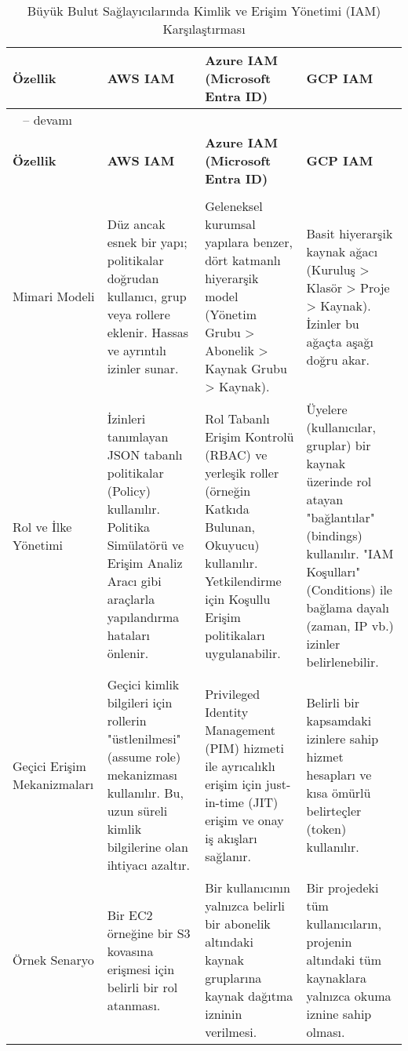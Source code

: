 \begin{longtable}{|>{\footnotesize}p{1.2cm}|>{\footnotesize}p{1.2cm}|>{\footnotesize}p{1.4cm}|>{\footnotesize}p{1.1cm}|}
\caption{Büyük Bulut Sağlayıcılarında Kimlik ve Erişim Yönetimi (IAM) Karşılaştırması}
\label{tab:iam_comparison}\\
\hline
\textbf{Özellik} & \textbf{AWS IAM} & \textbf{Azure IAM (Microsoft Entra ID)} & \textbf{GCP IAM}\\
\hline
\endfirsthead
\multicolumn{4}{c}%
{\tablename\ \thetable{} -- devamı}\\
\hline
\textbf{Özellik} & \textbf{AWS IAM} & \textbf{Azure IAM (Microsoft Entra ID)} & \textbf{GCP IAM}\\
\hline
\endhead
\hline
\multicolumn{4}{|r|}{Devamı bir sonraki sayfada}\\
\hline
\endfoot
\hline
\endlastfoot
Mimari Modeli & Düz ancak esnek bir yapı; politikalar doğrudan kullanıcı, grup veya rollere eklenir. Hassas ve ayrıntılı izinler sunar. & Geleneksel kurumsal yapılara benzer, dört katmanlı hiyerarşik model (Yönetim Grubu > Abonelik > Kaynak Grubu > Kaynak). & Basit hiyerarşik kaynak ağacı (Kuruluş > Klasör > Proje > Kaynak). İzinler bu ağaçta aşağı doğru akar. \\
\hline
Rol ve İlke Yönetimi & İzinleri tanımlayan JSON tabanlı politikalar (Policy) kullanılır. Politika Simülatörü ve Erişim Analiz Aracı gibi araçlarla yapılandırma hataları önlenir. & Rol Tabanlı Erişim Kontrolü (RBAC) ve yerleşik roller (örneğin Katkıda Bulunan, Okuyucu) kullanılır. Yetkilendirme için Koşullu Erişim politikaları uygulanabilir. & Üyelere (kullanıcılar, gruplar) bir kaynak üzerinde rol atayan "bağlantılar" (bindings) kullanılır. "IAM Koşulları" (Conditions) ile bağlama dayalı (zaman, IP vb.) izinler belirlenebilir. \\
\hline
Geçici Erişim Mekanizmaları & Geçici kimlik bilgileri için rollerin "üstlenilmesi" (assume role) mekanizması kullanılır. Bu, uzun süreli kimlik bilgilerine olan ihtiyacı azaltır. & Privileged Identity Management (PIM) hizmeti ile ayrıcalıklı erişim için just-in-time (JIT) erişim ve onay iş akışları sağlanır. & Belirli bir kapsamdaki izinlere sahip hizmet hesapları ve kısa ömürlü belirteçler (token) kullanılır. \\
\hline
Örnek Senaryo & Bir EC2 örneğine bir S3 kovasına erişmesi için belirli bir rol atanması. & Bir kullanıcının yalnızca belirli bir abonelik altındaki kaynak gruplarına kaynak dağıtma izninin verilmesi. & Bir projedeki tüm kullanıcıların, projenin altındaki tüm kaynaklara yalnızca okuma iznine sahip olması. \\
\hline
\end{longtable}

